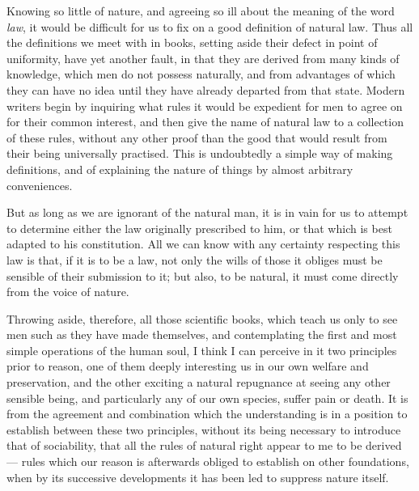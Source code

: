 \documentclass[12pt]{report}
\begin{document}
Knowing so little of nature, and agreeing so ill about the meaning of the word \emph{law}, it would be difficult for us to fix on a good definition of natural law. Thus all the definitions we meet with in books, setting aside their defect in point of uniformity, have yet another fault, in that they are derived from many kinds of knowledge, which men do not possess naturally, and from advantages of which they can have no idea until they have already departed from that state. Modern writers begin by inquiring what rules it would be expedient for men to agree on for their common interest, and then give the name of natural law to a collection of these rules, without any other proof than the good that would result from their being universally practised. This is undoubtedly a simple way of making definitions, and of explaining the nature of things by almost arbitrary conveniences.

But as long as we are ignorant of the natural man, it is in vain for us to attempt to determine either the law originally prescribed to him, or that which is best adapted to his constitution. All we can know with any certainty respecting this law is that, if it is to be a law, not only the wills of those it obliges must be sensible of their submission to it; but also, to be natural, it must come directly from the voice of nature.

Throwing aside, therefore, all those scientific books, which teach us only to see men such as they have made themselves, and contemplating the first and most simple operations of the human soul, I think I can perceive in it two principles prior to reason, one of them deeply interesting us in our own welfare and preservation, and the other exciting a natural repugnance at seeing any other sensible being, and particularly any of our own species, suffer pain or death. It is from the agreement and combination which the understanding is in a position to establish between these two principles, without its being necessary to introduce that of sociability, that all the rules of natural right appear to me to be derived — rules which our reason is afterwards obliged to establish on other foundations, when by its successive developments it has been led to suppress nature itself.
\end{document}

